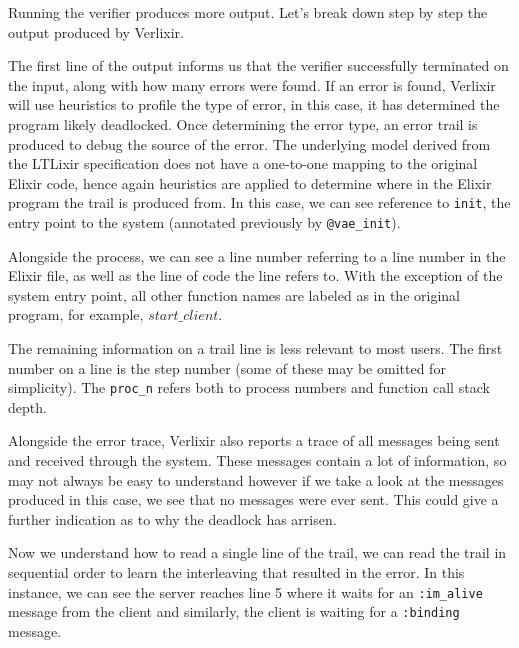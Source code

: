 Running the verifier produces more output. Let's break down step by step the output produced by Verlixir. 
\par
The first line of the output informs us that the verifier successfully terminated on the input, along with how many errors were found. If an error is found, Verlixir will use heuristics to profile the type of error, in this case, it has determined the program likely deadlocked. Once determining the error type, an error trail is produced to debug the source of the error. The underlying model derived from the LTLixir specification does not have a one-to-one mapping to the original Elixir code, hence again heuristics are applied to determine where in the Elixir program the trail is produced from. In this case, we can see reference to \texttt{init}, the entry point to the system (annotated previously by \texttt{@vae\_init}).
\par
Alongside the process, we can see a line number referring to a line number in the Elixir file, as well as the line of code the line refers to. With the exception of the system entry point, all other function names are labeled as in the original program, for example, $start\_client$.
\par
The remaining information on a trail line is less relevant to most users. The first number on a line is the step number (some of these may be omitted for simplicity). The \texttt{proc\_n} refers both to process numbers and function call stack depth.
\par
Alongside the error trace, Verlixir also reports a trace of all messages being sent and received through the system. These messages contain a lot of information, so may not always be easy to understand however if we take a look at the messages produced in this case, we see that no messages were ever sent. This could give a further indication as to why the deadlock has arrisen.
\par
Now we understand how to read a single line of the trail, we can read the trail in sequential order to learn the interleaving that resulted in the error. In this instance, we can see the server reaches line 5 where it waits for an \texttt{:im\_alive} message from the client and similarly, the client is waiting for a \texttt{:binding} message.
